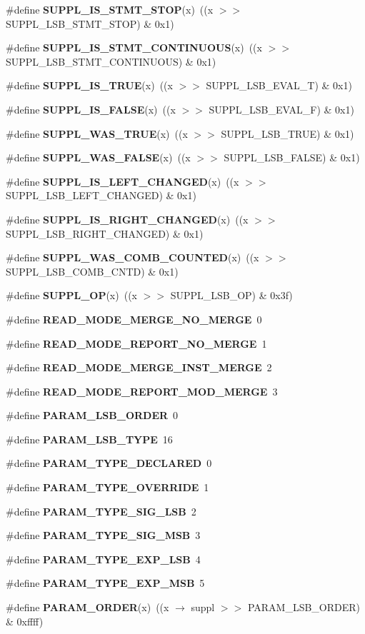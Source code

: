 \begin{CompactItemize}
\#define {\bf SUPPL\_\-IS\_\-STMT\_\-STOP}(x)\ ((x $>$$>$ SUPPL\_\-LSB\_\-STMT\_\-STOP) \& 0x1)
\item 
\#define {\bf SUPPL\_\-IS\_\-STMT\_\-CONTINUOUS}(x)\ ((x $>$$>$ SUPPL\_\-LSB\_\-STMT\_\-CONTINUOUS) \& 0x1)
\item 
\#define {\bf SUPPL\_\-IS\_\-TRUE}(x)\ ((x $>$$>$ SUPPL\_\-LSB\_\-EVAL\_\-T) \& 0x1)
\item 
\#define {\bf SUPPL\_\-IS\_\-FALSE}(x)\ ((x $>$$>$ SUPPL\_\-LSB\_\-EVAL\_\-F) \& 0x1)
\item 
\#define {\bf SUPPL\_\-WAS\_\-TRUE}(x)\ ((x $>$$>$ SUPPL\_\-LSB\_\-TRUE) \& 0x1)
\item 
\#define {\bf SUPPL\_\-WAS\_\-FALSE}(x)\ ((x $>$$>$ SUPPL\_\-LSB\_\-FALSE) \& 0x1)
\item 
\#define {\bf SUPPL\_\-IS\_\-LEFT\_\-CHANGED}(x)\ ((x $>$$>$ SUPPL\_\-LSB\_\-LEFT\_\-CHANGED) \& 0x1)
\item 
\#define {\bf SUPPL\_\-IS\_\-RIGHT\_\-CHANGED}(x)\ ((x $>$$>$ SUPPL\_\-LSB\_\-RIGHT\_\-CHANGED) \& 0x1)
\item 
\#define {\bf SUPPL\_\-WAS\_\-COMB\_\-COUNTED}(x)\ ((x $>$$>$ SUPPL\_\-LSB\_\-COMB\_\-CNTD) \& 0x1)
\item 
\#define {\bf SUPPL\_\-OP}(x)\ ((x $>$$>$ SUPPL\_\-LSB\_\-OP) \& 0x3f)
\item 
\#define {\bf READ\_\-MODE\_\-MERGE\_\-NO\_\-MERGE}\ 0
\item 
\#define {\bf READ\_\-MODE\_\-REPORT\_\-NO\_\-MERGE}\ 1
\item 
\#define {\bf READ\_\-MODE\_\-MERGE\_\-INST\_\-MERGE}\ 2
\item 
\#define {\bf READ\_\-MODE\_\-REPORT\_\-MOD\_\-MERGE}\ 3
\item 
\#define {\bf PARAM\_\-LSB\_\-ORDER}\ 0
\item 
\#define {\bf PARAM\_\-LSB\_\-TYPE}\ 16
\item 
\#define {\bf PARAM\_\-TYPE\_\-DECLARED}\ 0
\item 
\#define {\bf PARAM\_\-TYPE\_\-OVERRIDE}\ 1
\item 
\#define {\bf PARAM\_\-TYPE\_\-SIG\_\-LSB}\ 2
\item 
\#define {\bf PARAM\_\-TYPE\_\-SIG\_\-MSB}\ 3
\item 
\#define {\bf PARAM\_\-TYPE\_\-EXP\_\-LSB}\ 4
\item 
\#define {\bf PARAM\_\-TYPE\_\-EXP\_\-MSB}\ 5
\item 
\#define {\bf PARAM\_\-ORDER}(x)\ ((x $\rightarrow$ suppl $>$$>$ PARAM\_\-LSB\_\-ORDER) \& 0xffff)
$$
\end{CompactItemize}
